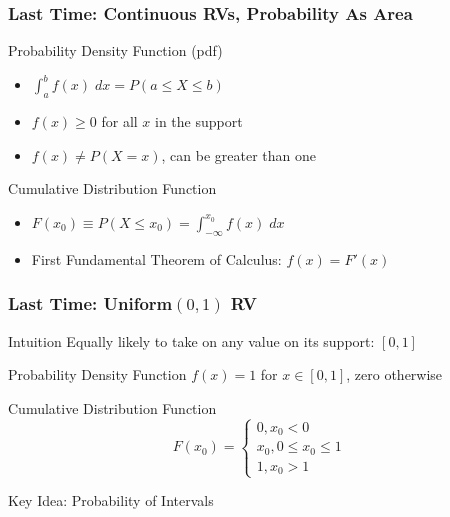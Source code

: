 \documentclass[handout]{beamer}
\begin{document}
\begin{frame}
\frametitle{Last Time: Continuous RVs,  Probability As Area}
\begin{block}{Probability Density Function (pdf)}
	\begin{itemize}
		\item $\int_a^b f(x) \; dx = P(a \leq X \leq b)$
		\item $f(x) \geq 0$ for all $x$ in the support
		\item $f(x) \neq P(X=x)$, can be greater than one
	\end{itemize}
\end{block}

\begin{block}{Cumulative Distribution Function}
	\begin{itemize}
		\item $F(x_0) \equiv P(X\leq x_0) =  \int_{-\infty}^{x_0} f(x) \; dx$
		\item First Fundamental Theorem of Calculus: $f(x) = F'(x)$ 
	\end{itemize}
\end{block}


\end{frame}
\begin{frame}
\frametitle{Last Time: Uniform$(0,1)$ RV}
\begin{block}{Intuition}
Equally likely to take on any value on its support: $[0,1]$
\end{block}
\begin{block}{Probability Density Function}
	$f(x) = 1$ for $x \in [0,1]$, zero otherwise
\end{block}
\begin{block}{Cumulative Distribution Function}
	$$ F(x_0) = \left\{ \begin{array}{c} 0, x_0 < 0\\ x_0, 0\leq x_0 \leq 1\\ 1, x_0 > 1   \end{array}\right.$$
\end{block}
\end{frame}
\begin{frame}
\Huge \begin{center}Key Idea: Probability of Intervals\end{center}
\end{frame}
\end{document}
